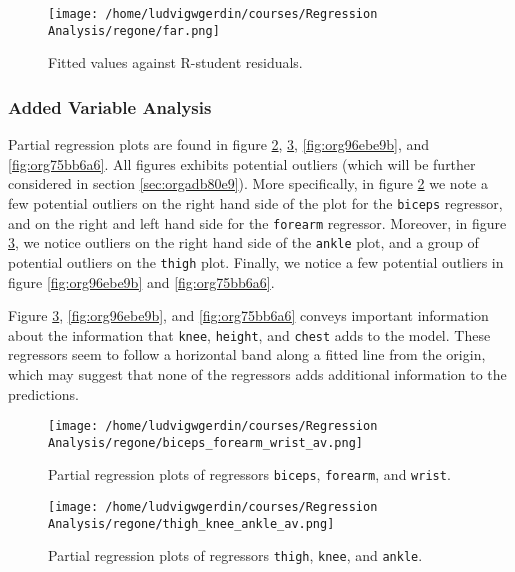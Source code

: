 \documentclass[11pt]{article}
\begin{document}
\begin{figure}[htbp]
\centering
\texttt{[image: /home/ludvigwgerdin/courses/Regression Analysis/regone/far.png]}
\caption{\label{fig:org631cca4}
Fitted values against R-student residuals.}
\end{figure}

\subsubsection{Added Variable Analysis}
\label{sec:orgab255e9}

Partial regression plots are found in figure \ref{fig:org222b26e}, \ref{fig:org0157cd4},
\ref{fig:org96ebe9b}, and \ref{fig:org75bb6a6}. All figures exhibits potential outliers 
(which will be further considered in section \ref{sec:orgadb80e9}).
More specifically, in figure \ref{fig:org222b26e} we note a 
few potential outliers on the right hand side of the plot for the \texttt{biceps} regressor, and on the
right and left hand side for the \texttt{forearm} regressor. Moreover, in figure \ref{fig:org0157cd4}, we 
notice outliers on the right hand side of the \texttt{ankle} plot, and a group of potential outliers on the
\texttt{thigh} plot. Finally, we notice a few potential outliers in figure \ref{fig:org96ebe9b} and 
\ref{fig:org75bb6a6}.

Figure \ref{fig:org0157cd4}, \ref{fig:org96ebe9b}, and \ref{fig:org75bb6a6} 
conveys important information about the information that \texttt{knee}, \texttt{height}, and
\texttt{chest} adds to the model. These regressors seem to follow a horizontal band along a fitted 
line from the origin, which may suggest that none of the regressors adds additional information 
to the predictions.

\begin{figure}[htbp]
\centering
\texttt{[image: /home/ludvigwgerdin/courses/Regression Analysis/regone/biceps\_forearm\_wrist\_av.png]}
\caption{\label{fig:org222b26e}
Partial regression plots of regressors \texttt{biceps}, \texttt{forearm}, and \texttt{wrist}.}
\end{figure}   

\begin{figure}[htbp]
\centering
\texttt{[image: /home/ludvigwgerdin/courses/Regression Analysis/regone/thigh\_knee\_ankle\_av.png]}
\caption{\label{fig:org0157cd4}
Partial regression plots of regressors \texttt{thigh}, \texttt{knee}, and \texttt{ankle}.}
\end{figure}
\end{document}
